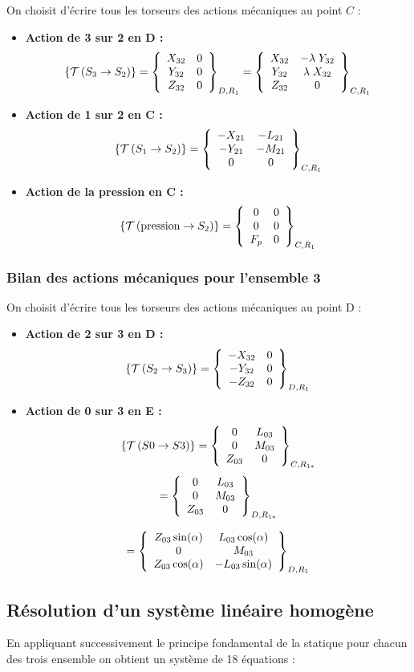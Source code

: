 \documentclass[10pt,fleqn]{article} %
\begin{document}
On choisit d'écrire tous les torseurs des actions mécaniques au point $C$ :
\begin{itemize}
\item \textbf{Action de 3 sur 2 en D :}\\
$$
\torseurstat{T}{S_3}{S_2}
=\torseurcol{X_{32}}{Y_{32}}{Z_{32}}{0}{0}{0}{D,R_1}
=\torseurcol{X_{32}}{Y_{32}}{Z_{32}}{-\lambda \;Y_{32}}{\lambda \;X_{32}}{0}{C,R_1}
$$
\item \textbf{Action de 1 sur 2 en C :}\\
$$
\torseurstat{T}{S_1}{S_{2}}
=\torseurcol{-X_{21}}{-Y_{21}}{0}{-L_{21}}{-M_{21}}{0}{C,R_1}
$$

\item \textbf{Action de la pression en C :}\\
$$
\torseurstat{T}{\text{pression}}{S_{2}}
=\torseurcol{0}{0}{F_p}{0}{0}{0}{C,R_1}
$$
\end{itemize}

\subsubsection{Bilan des actions mécaniques pour l'ensemble 3}

On choisit d'écrire tous les torseurs des actions mécaniques au point D :
\begin{itemize}
\item \textbf{Action de 2 sur 3 en D :}\\
$$
\torseurstat{T}{S_2}{S_3}
=\torseurcol{-X_{32}}{-Y_{32}}{ -Z_{32}}{0}{0}{0}{D,R_1}
$$
\item \textbf{Action de 0 sur 3 en E :}\\
$$
\torseurstat{T}{S0}{S3}
=\torseurcol{0}{0}{Z_{03}}{L_{03}}{M_{03}}{0}{C,R_{1*}}
$$
$$
=\torseurcol{0}{0}{Z_{03}}{L_{03}}{M_{03}}{ 0}{D,R_{1*}}$$

$$
=\torseurcol{Z_{03}\sin(\alpha) }{ 0 }{ Z_{03}\cos(\alpha)}{L_{03}\cos(\alpha) }{ M_{03} }{ -L_{03}\sin(\alpha)}{D,R_{1}}
$$
\end{itemize}






\subsection{Résolution d'un système linéaire homogène}

En appliquant successivement le principe fondamental de la statique pour chacun des trois ensemble on obtient un système de 18 équations :
\end{document}
